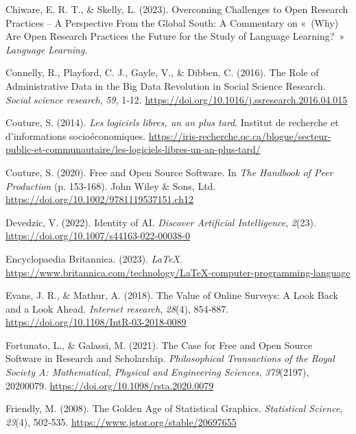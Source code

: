 \documentclass[
  letterpaper,
  DIV=11,
  numbers=noendperiod,
  oneside]{scrreprt}
\newlength{\cslhangindent}
\newlength{\cslentryspacingunit} %
\newenvironment{CSLReferences}[2] %
 {%
  \setlength{\parindent}{0pt}
  \ifodd #1
  \let\oldpar\par
  \def\par{\hangindent=\cslhangindent\oldpar}
  \fi
  \setlength{\parskip}{#2\cslentryspacingunit}
 }%
 {}
\begin{document}
\begin{CSLReferences}{1}{0}
\leavevmode{}%
Chiware, E. R. T., \& Skelly, L. (2023). Overcoming {Challenges} to
{Open Research Practices} -- {A Perspective From} the {Global South}: {A
Commentary} on {«~({Why}) {Are Open Research Practices} the {Future} for
the {Study} of {Language Learning}?~»} \emph{Language Learning}.

\leavevmode{}%
Connelly, R., Playford, C. J., Gayle, V., \& Dibben, C. (2016). The Role
of Administrative Data in the Big Data Revolution in Social Science
Research. \emph{Social science research}, \emph{59}, 1‑12.
\url{https://doi.org/10.1016/j.ssresearch.2016.04.015}

\leavevmode{}%
Couture, S. (2014). \emph{Les logiciels libres, un an plus tard}.
Institut de recherche et d'informations socioéconomiques.
\url{https://iris-recherche.qc.ca/blogue/secteur-public-et-communautaire/les-logiciels-libres-un-an-plus-tard/}

\leavevmode{}%
Couture, S. (2020). Free and {Open Source Software}. In \emph{The
{Handbook} of {Peer Production}} (p. 153‑168). John Wiley \& Sons, Ltd.
\url{https://doi.org/10.1002/9781119537151.ch12}

\leavevmode{}%
Devedzic, V. (2022). Identity of {AI}. \emph{Discover Artificial
Intelligence}, \emph{2}(23).
\url{https://doi.org/10.1007/s44163-022-00038-0}

\leavevmode{}%
Encyclopaedia Britannica. (2023). \emph{{LaTeX}}.
\url{https://www.britannica.com/technology/LaTeX-computer-programming-language}

\leavevmode{}%
Evans, J. R., \& Mathur, A. (2018). The Value of Online Surveys: {A}
Look Back and a Look Ahead. \emph{Internet research}, \emph{28}(4),
854‑887. \url{https://doi.org/10.1108/IntR-03-2018-0089}

\leavevmode{}%
Fortunato, L., \& Galassi, M. (2021). The Case for Free and Open Source
Software in Research and Scholarship. \emph{Philosophical Transactions
of the Royal Society A: Mathematical, Physical and Engineering
Sciences}, \emph{379}(2197), 20200079.
\url{https://doi.org/10.1098/rsta.2020.0079}

\leavevmode{}%
Friendly, M. (2008). The {Golden Age} of {Statistical Graphics}.
\emph{Statistical Science}, \emph{23}(4), 502‑535.
\url{https://www.jstor.org/stable/20697655}


\end{CSLReferences}
\end{document}
